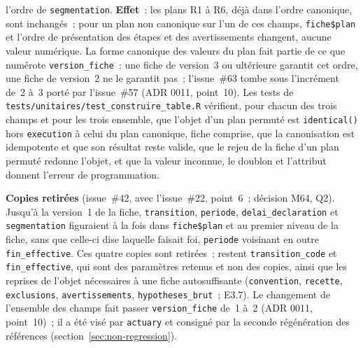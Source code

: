 \documentclass[a4paper,11pt]{article}
\newcommand{\code}[1]{\texttt{\small #1}}
\begin{document}
l'ordre de \code{segmentation}. \textbf{Effet}~: les plans R1 à R6, déjà
dans l'ordre canonique, sont inchangés~; pour un plan non canonique sur
l'un de ces champs, \code{fiche\$plan} et l'ordre de présentation des
étapes et des avertissements changent, aucune valeur numérique. La forme
canonique des valeurs du plan fait partie de ce que numérote
\code{version\_fiche}~: une fiche de version~3 ou ultérieure garantit cet ordre, une
fiche de version~2 ne le garantit pas~; l'issue~\#63 tombe sous l'incrément de~2 à~3
porté par l'issue~\#57 (ADR 0011, point~10). Les tests de
\code{tests/unitaires/test\_construire\_table.R} vérifient, pour chacun des
trois champs et pour les trois ensemble, que l'objet d'un plan permuté est
\code{identical()} hors \code{execution} à celui du plan canonique, fiche
comprise, que la canonisation est idempotente et que son résultat reste
valide, que le rejeu de la fiche d'un plan permuté redonne l'objet, et que
la valeur inconnue, le doublon et l'attribut donnent l'erreur de
programmation.

\medskip
\noindent
\textbf{Copies retirées} (issue~\#42, avec l'issue~\#22, point~6~; décision
M64, Q2). Jusqu'à la version~1 de la fiche, \code{transition},
\code{periode}, \code{delai\_declaration} et \code{segmentation} figuraient
à la fois dans \code{fiche\$plan} et au premier niveau de la fiche, sans que
celle-ci dise laquelle faisait foi, \code{periode} voisinant en outre
\code{fin\_effective}. Ces quatre copies sont retirées~; restent
\code{transition\_code} et \code{fin\_effective}, qui sont des paramètres
retenus et non des copies, ainsi que les reprises de l'objet nécessaires à une
fiche autosuffisante (\code{convention}, \code{recette},
\code{exclusions}, \code{avertissements}, \code{hypotheses\_brut}~;
E3.7). Le changement de l'ensemble des champs fait passer
\code{version\_fiche} de~1 à~2 (ADR 0011, point~10)~; il a été visé par
\code{actuary} et consigné par la seconde régénération des références
(section~\ref{sec:non-regression}).
\end{document}
